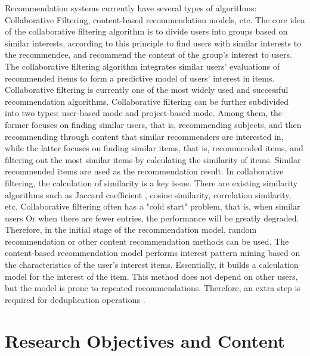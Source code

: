 Recommendation systems currently have several types of algorithms: Collaborative Filtering, content-based recommendation models, etc. The core idea of the collaborative filtering algorithm is to divide users into groups based on similar interests, according to this principle to find users with similar interests to the recommendee, and recommend the content of the group's interest to users. The collaborative filtering algorithm integrates similar users' evaluations of recommended items to form a predictive model of users' interest in items. Collaborative filtering is currently one of the most widely used and successful recommendation algorithms. Collaborative filtering can be further subdivided into two types: user-based mode and project-based mode\cite{su2009survey}. Among them, the former focuses on finding similar users, that is, recommending subjects, and then recommending through content that similar recommenders are interested in, while the latter focuses on finding similar items, that is, recommended items, and filtering out the most similar items by calculating the similarity of items. Similar recommended items are used as the recommendation result. In collaborative filtering, the calculation of similarity is a key issue. There are existing similarity algorithms such as Jaccard coefficient \cite{leeJ2020accardcf}, cosine similarity\cite{wang2006unifying}, correlation similarity\cite{mclaughlin2004collaborative}, etc. Collaborative filtering often has a "cold start" problem, that is, when similar users Or when there are fewer entries, the performance will be greatly degraded. Therefore, in the initial stage of the recommendation model, random recommendation or other content recommendation methods can be used. The content-based recommendation model performs interest pattern mining based on the characteristics of the user's interest items. Essentially, it builds a calculation model for the interest of the item. This method does not depend on other users, but the model is prone to repeated recommendations. Therefore, an extra step is required for deduplication operations \cite{gopalan2014content}.

\section{Research Objectives and Content}  %

